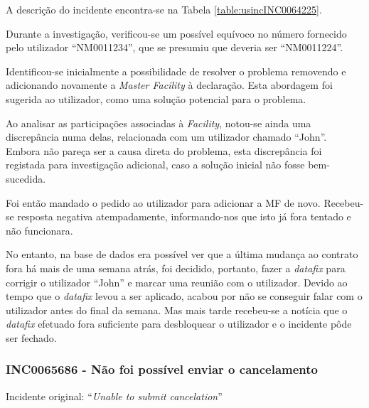             A descrição do incidente encontra-se na Tabela \ref{table:usincINC0064225}.

            Durante a investigação, verificou-se um possível equívoco no número fornecido pelo utilizador ``NM0011234'', que se presumiu que deveria ser ``NM0011224''. 

            Identificou-se inicialmente a possibilidade de resolver o problema removendo e adicionando novamente a \textit{Master Facility} à declaração. Esta abordagem foi sugerida ao utilizador, como uma solução potencial para o problema.
            
            Ao analisar as participações associadas à \textit{Facility}, notou-se ainda uma discrepância numa delas, relacionada com um utilizador chamado ``John''. Embora não pareça ser a causa direta do problema, esta discrepância foi registada para investigação adicional, caso a solução inicial não fosse bem-sucedida.

            Foi então mandado o pedido ao utilizador para adicionar a MF de novo. Recebeu-se resposta negativa atempadamente, informando-nos que isto já fora tentado e não funcionara.
            
            No entanto, na base de dados era possível ver que a última mudança ao contrato fora há mais de uma semana atrás, foi decidido, portanto, fazer a \textit{datafix} para corrigir o utilizador ``John'' e marcar uma reunião com o utilizador. Devido ao tempo que o \textit{datafix} levou a ser aplicado, acabou por não se conseguir falar com o utilizador antes do final da semana. Mas mais tarde recebeu-se a notícia que o \textit{datafix} efetuado fora suficiente para desbloquear o utilizador e o incidente pôde ser fechado.
            
        \subsubsection{INC0065686 - Não foi possível enviar o cancelamento}\label{secsec:inc0065686} %
                
            Incidente original: ``\textit{Unable to submit cancelation}''

